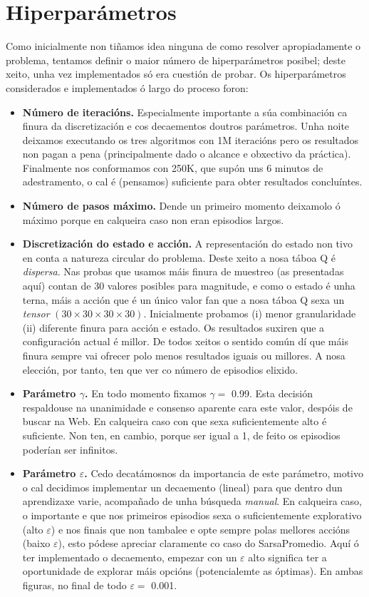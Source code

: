 \documentclass{article}
\begin{document}
\section{Hiperparámetros}
Como inicialmente non tiñamos idea ninguna de como resolver apropiadamente o problema, tentamos definir o maior número de hiperparámetros posibel; deste xeito, unha vez implementados só era cuestión de probar. Os hiperparámetros considerados e implementados ó largo do proceso foron:
\begin{itemize}
	\item \textbf{Número de iteracións.} Especialmente importante a súa combinación ca finura da discretización e cos decaementos doutros parámetros. Unha noite deixamos executando os tres algoritmos con 1M iteracións pero os resultados non pagan a pena (principalmente dado o alcance e obxectivo da práctica). Finalmente nos conformamos con 250K, que supón uns 6 minutos de adestramento, o cal é (pensamos) suficiente para obter resultados concluíntes. 
	\item \textbf{Número de pasos máximo.} Dende un primeiro momento deixamolo ó máximo porque en calqueira caso non eran episodios largos. 
	\item \textbf{Discretización do estado e acción.} A representación do estado non tivo en conta a natureza circular do problema. Deste xeito a nosa táboa Q é \emph{dispersa}. Nas probas que usamos máis finura de muestreo (as presentadas aquí) contan de 30 valores posibles para magnitude, e como o estado é unha terna, máis a acción que é un único valor fan que a nosa táboa Q sexa un \emph{tensor} $(30\times 30 \times 30 \times 30)$. Inicialmente probamos (i) menor granularidade (ii) diferente finura para acción e estado. Os resultados suxiren que a configuración actual é millor. De todos xeitos o sentido común dí que máis finura sempre vai ofrecer polo menos resultados iguais ou millores. A nosa elección, por tanto, ten que ver co número de episodios elixido.
	\item \textbf{Parámetro $\gamma$.} En todo momento fixamos $\gamma = $ 0.99. Esta decisión respaldouse na unanimidade e consenso aparente cara este valor, despóis de buscar na Web. En calqueira caso con que sexa suficientemente alto é suficiente. Non ten, en cambio, porque ser igual a 1, de feito os episodios poderían ser infinitos.
	\item \textbf{Parámetro $\varepsilon$.} Cedo decatámosnos da importancia de este parámetro, motivo o cal decidimos implementar un decaemento (lineal) para que dentro dun aprendizaxe varie, acompañado de unha búsqueda \emph{manual}. En calqueira caso, o importante e que nos primeiros episodios sexa o suficientemente explorativo (alto $\varepsilon$) e nos finais que non tambalee e opte sempre polas mellores accións (baixo $\varepsilon$), esto pódese apreciar claramente co caso do SarsaPromedio. Aquí ó ter implementado o decaemento, empezar con un $\varepsilon$ alto significa ter a oportunidade de explorar máis opcións (potencialemte as óptimas). En ambas figuras, no final de todo $\varepsilon =$ 0.001.


\end{itemize}
\end{document}

